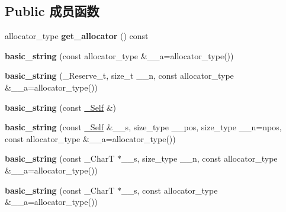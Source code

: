 \subsection*{Public 成员函数}
\begin{DoxyCompactItemize}
\item 
\mbox{\label{classbasic__string_aea81b057399babfb69968a1732bf22f8}} 
allocator\+\_\+type {\bfseries get\+\_\+allocator} () const
\item 
\mbox{\label{classbasic__string_a3ac7a482963191d04e3fb06d07e29b98}} 
{\bfseries basic\+\_\+string} (const allocator\+\_\+type \&\+\_\+\+\_\+a=allocator\+\_\+type())
\item 
\mbox{\label{classbasic__string_a0e874c8e816cb2f4f8d3f5a4799d2337}} 
{\bfseries basic\+\_\+string} (\+\_\+\+Reserve\+\_\+t, size\+\_\+t \+\_\+\+\_\+n, const allocator\+\_\+type \&\+\_\+\+\_\+a=allocator\+\_\+type())
\item 
\mbox{\label{classbasic__string_abfe8f6825ce11b39dc917d9e3435cac5}} 
{\bfseries basic\+\_\+string} (const \hyperlink{classbasic__string}{\+\_\+\+Self} \&)
\item 
\mbox{\label{classbasic__string_a799a71c41f5de88c234477a94bbcfbad}} 
{\bfseries basic\+\_\+string} (const \hyperlink{classbasic__string}{\+\_\+\+Self} \&\+\_\+\+\_\+s, size\+\_\+type \+\_\+\+\_\+pos, size\+\_\+type \+\_\+\+\_\+n=npos, const allocator\+\_\+type \&\+\_\+\+\_\+a=allocator\+\_\+type())
\item 
\mbox{\label{classbasic__string_a23953905f3e62f6e4f58581e098f4e98}} 
{\bfseries basic\+\_\+string} (const \+\_\+\+CharT $\ast$\+\_\+\+\_\+s, size\+\_\+type \+\_\+\+\_\+n, const allocator\+\_\+type \&\+\_\+\+\_\+a=allocator\+\_\+type())
\item 
\mbox{\label{classbasic__string_a938e3b631bb963b500a426e7343e1656}} 
{\bfseries basic\+\_\+string} (const \+\_\+\+CharT $\ast$\+\_\+\+\_\+s, const allocator\+\_\+type \&\+\_\+\+\_\+a=allocator\+\_\+type())
\item 
\mbox{\label{classbasic__string_afa37079dc478d33b97b12e49a1ea1543}} 

\end{DoxyCompactItemize}

